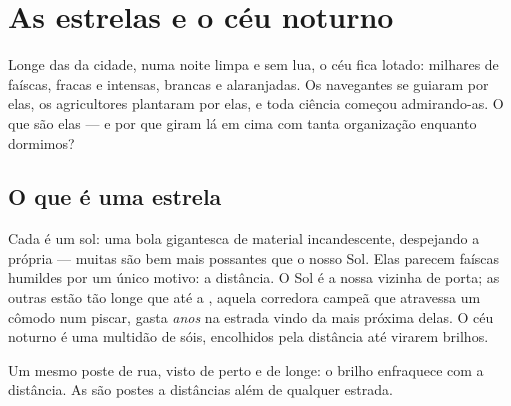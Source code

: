 \chapter{As estrelas e o céu noturno}\label{ch:g5:stars-night-sky}

Longe das  da cidade, numa noite limpa e sem lua, o céu fica
lotado: milhares de faíscas, fracas e intensas, brancas e alaranjadas.
Os navegantes se guiaram por elas, os agricultores plantaram por elas,
e toda ciência começou admirando-as. O que são elas --- e por que
giram lá em cima com tanta organização enquanto dormimos?

\section{O que é uma estrela}

\begin{example}\label{ex:g5:stars-night-sky:suns}
Cada  é um sol: uma bola gigantesca de material
incandescente, despejando a própria  --- muitas são bem mais
possantes que o nosso Sol. Elas parecem faíscas humildes por um único
motivo: a distância. O Sol é a nossa  vizinha de porta; as
outras estão tão longe que até a , aquela corredora campeã que
atravessa um cômodo num piscar, gasta \emph{anos} na estrada vindo da
mais próxima delas. O céu noturno é uma multidão de sóis, encolhidos
pela distância até virarem brilhos.
\end{example}

\begin{omfigure}

{\small Um mesmo poste de rua, visto de perto e de longe: o brilho
enfraquece com a distância. As  são postes a distâncias além
de qualquer estrada.}
\end{omfigure}

